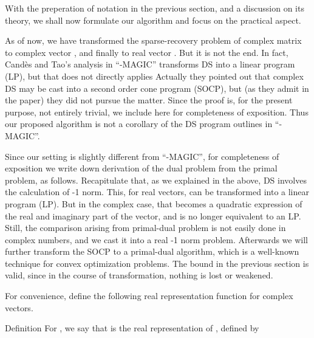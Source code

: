 \startchapter [title={Simulation}]

With the preperation of notation in the previous section, and a discussion on its theory, we shall now formulate our algorithm and focus on the practical aspect.

As of now, we have transformed the sparse-recovery problem of complex matrix  to complex vector , and finally to real vector .
But it is not the end.
In fact, Cand\`es and Tao's analysis in ``-MAGIC'' transforms DS into a linear program (LP), but that does not directly applies
Actually they pointed out that complex DS may be cast into a second order cone program (SOCP), but (as they admit in the paper) they did not pursue the matter.
Since the proof is, for the present purpose, not entirely trivial, we include here for completeness of exposition.
Thus our proposed algorithm is not a corollary of the DS program outlines in ``-MAGIC''.

\startsection [title={Representation by Real Matrices}]

Since our setting is slightly different from ``-MAGIC'', for completeness of exposition we write down derivation of the dual problem from the primal problem, as follows.
Recapitulate that, as we explained in the above, DS involves the calculation of -1 norm.
This, for real vectors, can be transformed into a linear program (LP).
But in the complex case, that becomes a quadratic expression of the real and imaginary part of the vector, and is no longer equivalent to an LP.
Still, the comparison arising from primal-dual problem is not easily done in complex numbers, and we cast it into a real -1 norm problem.
Afterwards we will further transform the SOCP to a primal-dual algorithm, which is a well-known technique for convex optimization problems.
The bound in the previous section is valid, since in the course of transformation, nothing is lost or weakened.

For convenience, define the following real representation function for complex vectors.

\Result
{Definition}
{
For , we say that  is the real representation of , defined by
%
%
}

